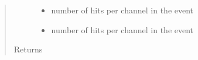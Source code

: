 \documentclass[letterpaper,10pt,english]{sphinxmanual}
\begin{document}
\begin{fulllineitems}
\begin{fulllineitems}
\begin{quote}
\begin{description}
\begin{itemize}
\item {} 
\sphinxAtStartPar
{} \textendash{} number of hits per channel in the event

\item {} 
\sphinxAtStartPar
{} \textendash{} number of hits per channel in the event

\end{itemize}

\item[{Returns}] \leavevmode
\sphinxAtStartPar


\end{description}\end{quote}

\end{fulllineitems}


\end{fulllineitems}

\end{document}
